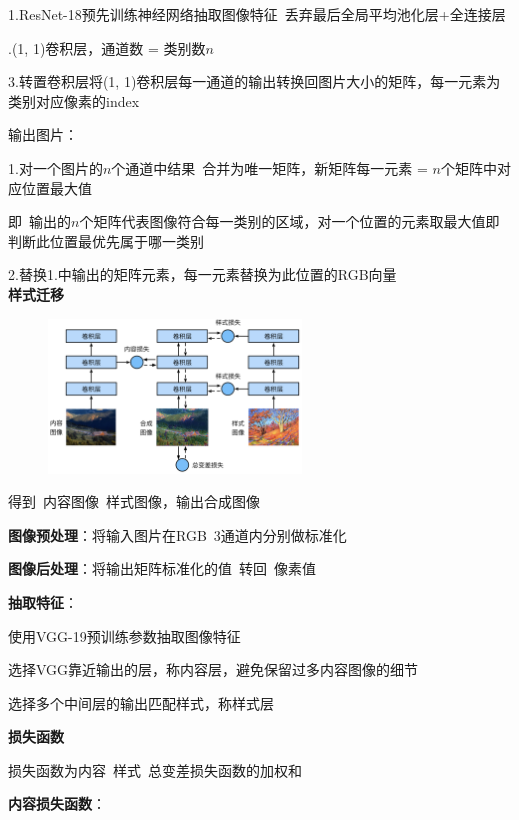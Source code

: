 \documentclass[UTF8]{ctexart}
\begin{document}
  \quad \quad 1.ResNet-18预先训练神经网络抽取图像特征\ 丢弃最后全局平均池化层+全连接层

  \quad {}.(1, 1)卷积层，通道数 = 类别数$n$
  
  \quad \quad 3.转置卷积层将(1, 1)卷积层每一通道的输出转换回图片大小的矩阵，每一元素为类别对应像素的index

  \quad 输出图片：
  
  \quad \quad 1.对一个图片的$n$个通道中结果\ 合并为唯一矩阵，新矩阵每一元素 = $n$个矩阵中对应位置最大值

  \quad \quad \quad 即\ 输出的$n$个矩阵代表图像符合每一类别的区域，对一个位置的元素取最大值即判断此位置最优先属于哪一类别
  
  \quad \quad 2.替换1.中输出的矩阵元素，每一元素替换为此位置的RGB向量\\
\textbf{样式迁移}

  \begin{figure}[H] %
    \centering %
    \includegraphics[width=0.6\textwidth]{note_images/style-transfer.png} %
  \end{figure}

  得到\ 内容图像\ 样式图像，输出合成图像

  \textbf{图像预处理}：将输入图片在RGB\ 3通道内分别做标准化

  \textbf{图像后处理}：将输出矩阵标准化的值\ 转回\ 像素值

  \textbf{抽取特征}：

  \quad 使用VGG-19预训练参数抽取图像特征

  \quad \quad 选择VGG靠近输出的层，称内容层，避免保留过多内容图像的细节

  \quad \quad 选择多个中间层的输出匹配样式，称样式层

  \textbf{损失函数}

  \quad 损失函数为内容\ 样式\ 总变差损失函数的加权和

  \quad \textbf{内容损失函数}：
\end{document}
